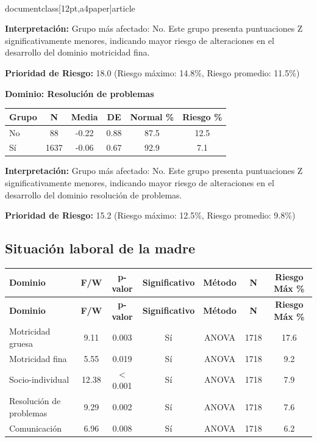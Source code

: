 \\documentclass[12pt,a4paper]{article}
\begin{document}
\textbf{Interpretación:} Grupo más afectado: No. Este grupo presenta puntuaciones Z significativamente menores, indicando mayor riesgo de alteraciones en el desarrollo del dominio motricidad fina.

\textbf{Prioridad de Riesgo:} 18.0 (Riesgo máximo: 14.8\%, Riesgo promedio: 11.5\%)


\vspace{0.5cm}


\textbf{Dominio: Resolución de problemas}


\begin{center}
\begin{tabular}{|l|c|c|c|c|c|}
\hline
\textbf{Grupo} & \textbf{N} & \textbf{Media} & \textbf{DE} & \textbf{Normal \%} & \textbf{Riesgo \%} \\
\hline
No & 88 & -0.22 & 0.88 & 87.5 & 12.5 \\
Sí & 1637 & -0.06 & 0.67 & 92.9 & 7.1 \\

\hline
\end{tabular}
\end{center}


\textbf{Interpretación:} Grupo más afectado: No. Este grupo presenta puntuaciones Z significativamente menores, indicando mayor riesgo de alteraciones en el desarrollo del dominio resolución de problemas.

\textbf{Prioridad de Riesgo:} 15.2 (Riesgo máximo: 12.5\%, Riesgo promedio: 9.8\%)


\vspace{0.5cm}


\subsection{Situación laboral de la madre}


\begin{longtable}{|l|c|c|c|c|c|c|}
\hline
\textbf{Dominio} & \textbf{F/W} & \textbf{p-valor} & \textbf{Significativo} & \textbf{Método} & \textbf{N} & \textbf{Riesgo Máx \%} \\
\hline
\endfirsthead

\hline
\textbf{Dominio} & \textbf{F/W} & \textbf{p-valor} & \textbf{Significativo} & \textbf{Método} & \textbf{N} & \textbf{Riesgo Máx \%} \\
\hline
\endhead

\hline
\endfoot

\hline
\endlastfoot

Motricidad gruesa & 9.11 & 0.003 & Sí & ANOVA & 1718 & 17.6 \\
Motricidad fina & 5.55 & 0.019 & Sí & ANOVA & 1718 & 9.2 \\
Socio-individual & 12.38 & < 0.001 & Sí & ANOVA & 1718 & 7.9 \\
Resolución de problemas & 9.29 & 0.002 & Sí & ANOVA & 1718 & 7.6 \\
Comunicación & 6.96 & 0.008 & Sí & ANOVA & 1718 & 6.2 \\

\end{longtable}
\end{document}
